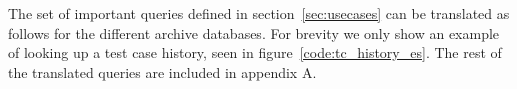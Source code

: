 The set of important queries defined in section~\ref{sec:usecases} can be translated as follows for the different archive databases. For brevity we only show an example of looking up a test case history, seen in figure~\ref{code:tc_history_es}. The rest of the translated queries are included in appendix A.

%
%
%
%
%
%
%


